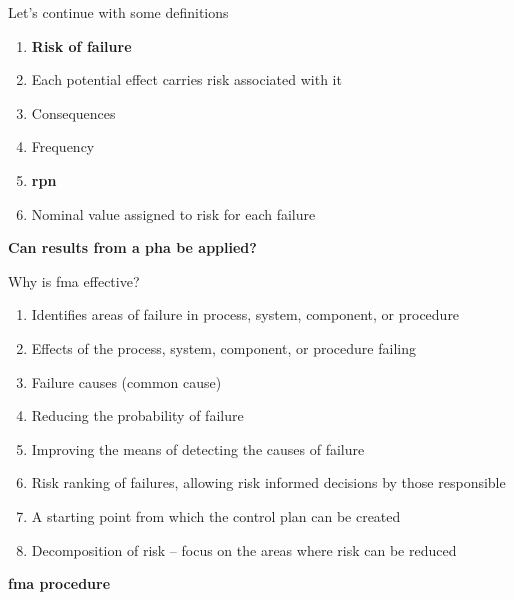 \documentclass[aspectratio=1610,pdftex,dvipsnames,compress,xcolor={dvipsnames}]{beamer}
\newcommand{\acl}{\acrlong} %
\newcommand{\acs}{\acrshort} %
\begin{document}
\begin{frame}{Let's continue with some definitions}
    \begin{enumerate}[series=outerlist,topsep=0pt,itemsep=1pt,leftmargin=*,label=(\arabic*)]
        \item[]\textbf{Risk of failure}
        \item[]Each potential effect carries risk associated with it
        \item[]Consequences
        \item[]Frequency
            \vspace{0.25in}
        \item[]\textbf{\acl{rpn}}
        \item[]Nominal value assigned to risk for each failure
    \end{enumerate}
\end{frame}


\begin{frame}[plain]{}
    \centering\LARGE\textbf{Can results from a \acs{pha} be applied?}
\end{frame}


\addtocounter{framenumber}{-1}
\begin{frame}{Why is \acs{fma} effective?}
    \begin{enumerate}[series=outerlist,topsep=0pt,itemsep=11pt,leftmargin=*,label=(\arabic*)]
        \item[]Identifies areas of failure in process, system, component, or procedure
        \item[]Effects of the process, system, component, or procedure failing
        \item[]Failure causes (common cause)
        \item[]Reducing the probability of failure  
        \item[]Improving the means of detecting the causes of failure  
        \item[]Risk ranking of failures, allowing risk informed decisions by those responsible 
        \item[]A starting point from which the control plan can be created
        \item[]Decomposition of risk -- focus on the areas where risk can be reduced
    \end{enumerate}
\end{frame}


\begin{frame}[plain]{}
    \centering\LARGE\textbf{\acs{fma} procedure}
\end{frame}
\end{document}
